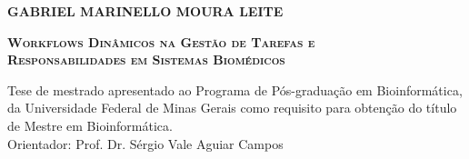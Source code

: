 \documentclass[12pt]{article}
\begin{document}
\begin{titlepage}

\vspace*{4cm}

\center \textsc{\fontsize{14}{12}\selectfont \textbf{GABRIEL MARINELLO MOURA LEITE}} \\

\vspace*{2cm}

\newcommand{\HRule}{\rule{\linewidth}{0.5mm}}
\textsc{\fontsize{16}{12}\selectfont \textbf{
Workflows Dinâmicos na Gestão de Tarefas e\\Responsabilidades em Sistemas Biomédicos}}\\[0.2cm] 

\vspace*{2cm}

\hspace{.3\textwidth}
\begin{minipage}{.6\textwidth}
\fontsize{10}{12}\selectfont Tese de mestrado apresentado ao Programa de Pós-graduação em Bioinformática, da Universidade Federal de Minas Gerais como requisito para obtenção do título de Mestre em Bioinformática. \\
\linebreak
Orientador: Prof. Dr. Sérgio Vale Aguiar Campos \\
\end{minipage}

\vspace*{\fill}


\end{titlepage}


\newpage



\tableofcontents

% 
% 
% 
% 










% 
% 


\end{document}
